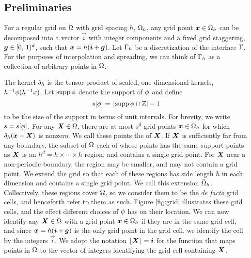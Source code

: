 \subsection{Preliminaries}

For a regular grid on $\Omega$ with grid spacing $h$, $\Omega_h$, any grid point
$\boldsymbol{x}\in\Omega_h$ can be decomposed into a vector $\vec{i}$ with integer components and a
fixed grid staggering, $\boldsymbol{g}\in[0,\,1)^d$, such that $\boldsymbol{x}=h(\boldsymbol{i}+\boldsymbol{g})$. Let
$\Gamma_h$ be a discretization of the interface $\Gamma$. For the purposes of
interpolation and spreading, we can think of $\Gamma_h$ as a collection of arbitrary
points in $\Omega$.



The kernel $\delta_h$ is the tensor product of scaled, one-dimensional kernels,
$h^{-1}\phi(h^{-1}x)$. Let $\operatorname{supp}\phi$ denote the support of $\phi$ and define
\begin{equation}
    s[\phi] = |\operatorname{supp}\phi\cap\mathbb{Z}|-1
\end{equation}
to be the size of the support in terms of unit intervals. For brevity, we write
$s=s[\phi]$. For any $\boldsymbol{X}\in\Omega$, there are at most $s^d$ grid points
$\boldsymbol{x}\in\Omega_h$ for which $\delta_h(\boldsymbol{x}-\boldsymbol{X})$ is nonzero. We call these points the
 of $\boldsymbol{X}$. If $\boldsymbol{X}$ is sufficiently far from any boundary, the subset
of $\Omega$ each of whose points has the same support points as $\boldsymbol{X}$ is an
$h^d=h\times\cdots\times h$ region, and contains a single grid point. For $\boldsymbol{X}$ near a
non-periodic boundary, the region may be smaller, and may not contain a grid point. We
extend the grid so that each of these regions has side length $h$ in each dimension and
contains a single grid point.  We call this extension $\bar{\Omega}_h$. Collectively,
these regions cover $\Omega$, so we consider them to be the \emph{de facto} grid cells,
and henceforth refer to them as such. Figure \ref{fig:grid} illustrates these grid cells,
and the effect different choices of $\phi$ has on their location. We can now identify
any $\boldsymbol{X}\in\Omega$ with a grid point $\boldsymbol{x}\in\bar{\Omega}_h$ if they are in the same grid
cell, and since $\boldsymbol{x}=h(\boldsymbol{i}+\boldsymbol{g})$ is the only grid point in the grid cell, we
identify the cell by the integers $\vec{i}$. We adopt the notation $\left\lfloor{\boldsymbol{X}}\right\rceil=\boldsymbol{i}$ for
the function that maps points in $\Omega$ to the vector of integers identifying the grid
cell containing $\boldsymbol{X}$.

